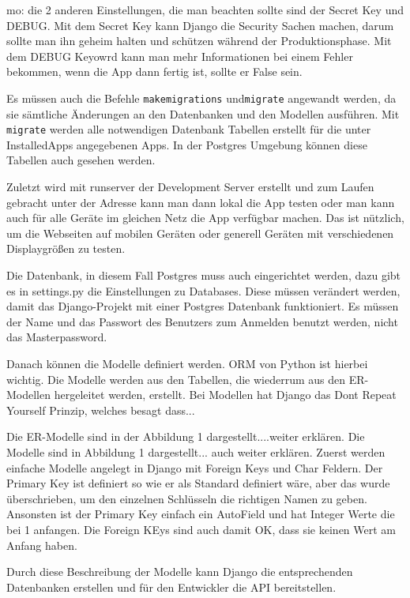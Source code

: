 \documentclass[11pt,a4paper]{report}
\begin{document}
mo: die 2 anderen Einstellungen, die man beachten sollte sind der Secret Key und DEBUG. Mit dem Secret Key kann Django die Security Sachen machen, darum sollte man ihn geheim halten und schützen während der Produktionsphase. Mit dem DEBUG Keyowrd kann man mehr Informationen bei einem Fehler bekommen, wenn die App dann fertig ist, sollte er False sein.

Es müssen auch die Befehle \verb|makemigrations| und\verb|migrate| angewandt werden, da sie sämtliche Änderungen an den Datenbanken und den Modellen ausführen.  Mit \verb|migrate| werden alle notwendigen Datenbank Tabellen erstellt für die unter InstalledApps angegebenen Apps. In der Postgres Umgebung können diese Tabellen auch gesehen werden. 

Zuletzt wird mit runserver der Development Server erstellt und zum Laufen gebracht unter der Adresse kann man dann lokal die App testen oder man kann auch für alle Geräte im gleichen Netz die App verfügbar machen. Das ist nützlich, um die Webseiten auf mobilen Geräten oder generell Geräten mit verschiedenen Displaygrößen zu testen.

Die Datenbank, in diesem Fall Postgres muss auch eingerichtet werden, dazu gibt es in settings.py die Einstellungen zu Databases. Diese müssen verändert werden, damit das Django-Projekt mit einer Postgres Datenbank funktioniert. Es müssen der Name und das Passwort des Benutzers zum Anmelden benutzt werden, nicht das Masterpassword.  


Danach können die Modelle definiert werden. ORM von Python ist hierbei wichtig. Die Modelle werden aus den Tabellen, die wiederrum aus den ER-Modellen hergeleitet werden, erstellt. Bei Modellen hat Django das Dont Repeat Yourself Prinzip, welches besagt dass...

Die ER-Modelle sind in der Abbildung 1 dargestellt....weiter erklären. Die Modelle sind in Abbildung 1 dargestellt... auch weiter erklären. Zuerst werden einfache Modelle angelegt in Django mit Foreign Keys und Char Feldern. Der Primary Key ist definiert so wie er als Standard definiert wäre, aber das wurde überschrieben, um den einzelnen Schlüsseln die richtigen Namen zu geben. Ansonsten ist der Primary Key einfach ein AutoField und hat Integer Werte die bei 1 anfangen. Die Foreign KEys sind auch damit OK, dass sie keinen Wert am Anfang haben. 

Durch diese Beschreibung der Modelle kann Django die entsprechenden Datenbanken erstellen und für den Entwickler die API bereitstellen.
\end{document}
